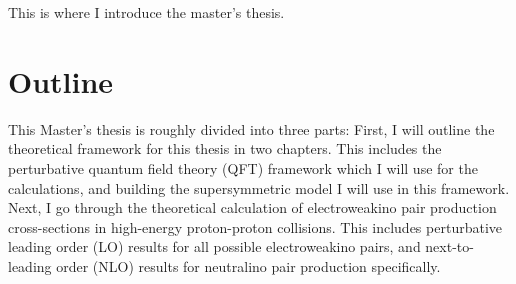 This is where I introduce the master's thesis.


\section*{Outline}
This Master's thesis is roughly divided into three parts:
First, I will outline the theoretical framework for this thesis in two chapters.
This includes the perturbative quantum field theory (QFT) framework which I will use for the calculations, and building the supersymmetric model I will use in this framework.
Next, I go through the theoretical calculation of electroweakino pair production cross-sections in high-energy proton-proton collisions.
This includes perturbative leading order (LO) results for all possible electroweakino pairs, and next-to-leading order (NLO) results for neutralino pair production specifically.

\ifSubfilesClassLoaded{%
  {}
  
}{}
